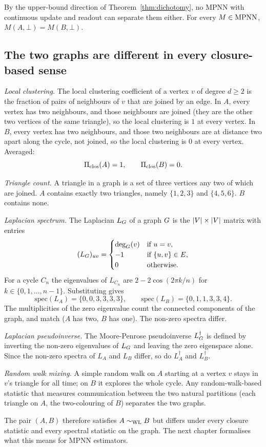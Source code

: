 By the upper-bound direction of Theorem~\ref{thm:dichotomy}, no MPNN with
continuous update and readout can separate them either. For every $M
\in \mathrm{MPNN}$, $M(A, \bot) = M(B, \bot)$.

\subsection{The two graphs are different in every closure-based sense}

\emph{Local clustering.} The local clustering coefficient of a vertex
$v$ of degree $d \ge 2$ is the fraction of pairs of neighbours of $v$
that are joined by an edge. In $A$, every vertex has two neighbours,
and those neighbours are joined (they are the other two vertices of
the same triangle), so the local clustering is $1$ at every vertex.
In $B$, every vertex has two neighbours, and those two neighbours are
at distance two apart along the cycle, not joined, so the local
clustering is $0$ at every vertex. Averaged:
\[
\Pi_{\mathrm{clos}}(A) = 1, \qquad \Pi_{\mathrm{clos}}(B) = 0.
\]

\emph{Triangle count.} A triangle in a graph is a set of three
vertices any two of which are joined. $A$ contains exactly two
triangles, namely $\{1, 2, 3\}$ and $\{4, 5, 6\}$. $B$ contains none.

\emph{Laplacian spectrum.} The Laplacian $L_G$ of a graph $G$
is the $|V| \times |V|$ matrix with entries
\[
(L_G)_{uv} =
\begin{cases}
\deg_G(v) & \text{if } u = v, \\
-1 & \text{if } \{u, v\} \in E, \\
0 & \text{otherwise.}
\end{cases}
\]
For a cycle $C_n$ the eigenvalues of $L_{C_n}$ are $2 - 2\cos(2\pi k
/ n)$ for $k \in \{0, 1, \dots, n-1\}$. Substituting gives
\[
\mathrm{spec}(L_A) = \{0, 0, 3, 3, 3, 3\},
\qquad
\mathrm{spec}(L_B) = \{0, 1, 1, 3, 3, 4\}.
\]
The multiplicities of the zero eigenvalue count the connected
components of the graph, and match ($A$ has two, $B$ has one). The
non-zero spectra differ.

\emph{Laplacian pseudoinverse.} The Moore-Penrose pseudoinverse
$L_G^\dagger$ is defined by inverting the non-zero eigenvalues of
$L_G$ and leaving the zero eigenspace alone. Since the non-zero
spectra of $L_A$ and $L_B$ differ, so do $L_A^\dagger$ and
$L_B^\dagger$.

\emph{Random walk mixing.} A simple random walk on $A$ starting at a
vertex $v$ stays in $v$'s triangle for all time; on $B$ it explores
the whole cycle. Any random-walk-based statistic that measures
communication between the two natural partitions (each triangle on
$A$, the two-colouring of $B$) separates the two graphs.

The pair $(A, B)$ therefore satisfies $A \sim_{\mathrm{WL}} B$ but differs
under every closure statistic and every spectral statistic on the
graph. The next chapter formalises what this means for MPNN
estimators.

